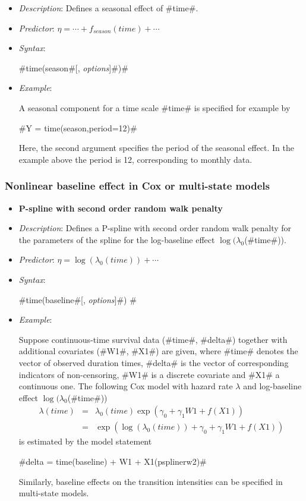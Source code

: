 \begin{itemize}
\item[] {\em Description}: Defines a seasonal effect of #time#.
\item[] {\em Predictor}: $\eta =  \cdots + f_{season}(time) + \cdots $
\item[] {\em Syntax}:

#time(season#[, {\em options}]#)#
\item[] {\em Example}:

A seasonal component for a time scale #time# is specified for
example by

#Y = time(season,period=12)#

Here, the second argument specifies the period of the seasonal
effect. In the example above the period is 12, corresponding to
monthly data.
\end{itemize}

\subsubsection*{Nonlinear baseline effect in Cox or multi-state models}

\begin{itemize}
\item[]{\bf\sffamily P-spline with second order random walk
penalty}

\item[] {\em Description}: Defines a P-spline with second order
random walk penalty for the parameters of the spline for the
log-baseline effect $\log(\lambda_0$(#time#)). \item[] {\em
Predictor}: $\eta = \log(\lambda_0(time)) + \cdots$ \item[] {\em
Syntax}:

#time(baseline#[, {\em options}]#) # \item[] {\em Example}:

Suppose continuous-time survival data (#time#, #delta#) together
with additional covariates (#W1#, #X1#) are given, where #time#
denotes the vector of observed duration times, #delta# is the vector
of corresponding indicators of non-censoring, #W1# is a discrete
covariate and #X1# a continuous one. The following Cox model with
hazard rate $\lambda$ and log-baseline effect
$\log(\lambda_0$(#time#))
\begin{eqnarray*}
 \lambda(time) & = & \lambda_0(time)\exp (\gamma_0 + \gamma_1 W1 + f(X1))\\
 & = & \exp\left(\log(\lambda_0(time)) + \gamma_0 + \gamma_1 W1 + f(X1)\right)
\end{eqnarray*}
is estimated by the model statement

#delta = time(baseline) + W1 + X1(psplinerw2)#

Similarly, baseline effects on the transition intensities can be
specified in multi-state models.
\end{itemize}


